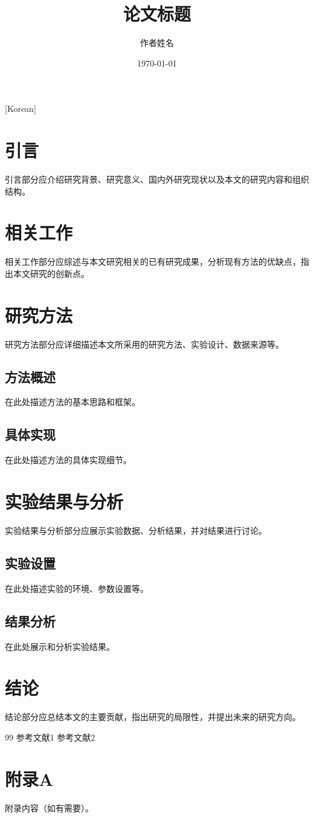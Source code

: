 [Korean] \documentclass[12pt,a4paper,twocolumn]{article}
\title{论文标题}
\author{作者姓名}
\date{\today}
\begin{document}

\section{引言}
引言部分应介绍研究背景、研究意义、国内外研究现状以及本文的研究内容和组织结构。

\section{相关工作}
相关工作部分应综述与本文研究相关的已有研究成果，分析现有方法的优缺点，指出本文研究的创新点。

\section{研究方法}
研究方法部分应详细描述本文所采用的研究方法、实验设计、数据来源等。

\subsection{方法概述}
在此处描述方法的基本思路和框架。

\subsection{具体实现}
在此处描述方法的具体实现细节。

\section{实验结果与分析}
实验结果与分析部分应展示实验数据、分析结果，并对结果进行讨论。

\subsection{实验设置}
在此处描述实验的环境、参数设置等。

\subsection{结果分析}
在此处展示和分析实验结果。

\section{结论}
结论部分应总结本文的主要贡献，指出研究的局限性，并提出未来的研究方向。

\begin{thebibliography}{99}
 参考文献1
 参考文献2
\end{thebibliography}

\appendix
\section{附录A}
附录内容（如有需要）。
\end{document}
